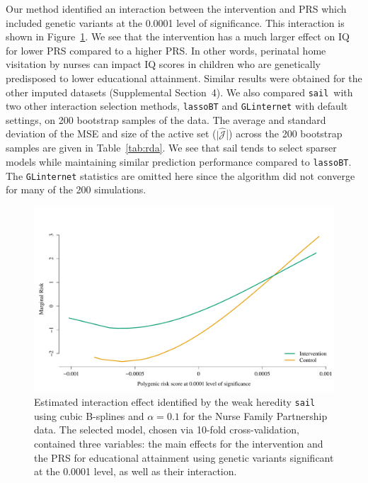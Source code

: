 \documentclass[useAMS,usenatbib,referee]{biom}
\newcommand{\sail}{\texttt{sail}}
\begin{document}
Our method identified an interaction between the intervention and PRS which included genetic variants at the 0.0001 level of significance. 
This interaction is shown in Figure~\ref{fig:PRS-intervention-interaction}. 
We see that the intervention has a much larger effect on IQ for lower PRS compared to a higher PRS. 
In other words, perinatal home visitation by nurses can impact IQ scores in children who are genetically predisposed to lower educational attainment. Similar results were obtained for the other imputed datasets (Supplemental Section~4). 
We also compared \sail ~with two other interaction selection methods, \texttt{lassoBT} and \texttt{GLinternet} with default settings, on 200 bootstrap samples of the data. The average and standard deviation of the MSE and size of the active set ($|\widehat{\mathcal{J}}$|) across the 200 bootstrap samples are given in Table~\ref{tab:rda}. We see that sail tends to select sparser models while maintaining similar prediction performance compared to \texttt{lassoBT}. The \texttt{GLinternet} statistics are omitted here since the algorithm did not converge for many of the 200 simulations.





%
%
%

\begin{figure}
	
	{\centering \includegraphics[width=1\linewidth]{../figure/PRS-intervention-interaction-1} 
		
	}
	
	\caption[Estimated interaction effect identified by the weak heredity \texttt{sail} using cubic B-splines and $\alpha=0.1$ for the Nurse Family Partnership data]{Estimated interaction effect identified by the weak heredity \texttt{sail} using cubic B-splines and $\alpha=0.1$ for the Nurse Family Partnership data. The selected model, chosen via 10-fold cross-validation, contained three variables: the main effects for the intervention and the PRS for educational attainment using genetic variants significant at the 0.0001 level, as well as their interaction.}\label{fig:PRS-intervention-interaction}
\end{figure}
\end{document}
